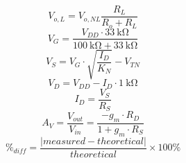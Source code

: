 %
\begin{equation}
  \label{eq:amp}
  V_{o,L} = V_{o,NL} \frac{R_L}{R_o + R_L}
\end{equation}
%
\begin{equation}
  \label{eq:V_G}
  V_G = \frac{V_{DD} \cdot \SI{33}{\kilo\ohm}}{\SI{100}{\kilo\ohm} + \SI{33}{\kilo\ohm}}
\end{equation}
%
\begin{equation}
  \label{eq:V_S}
  V_S = V_G \cdot \sqrt{\frac{I_D}{K_N}} - V_{TN}
\end{equation}
%
\begin{equation}
  \label{eq:V_D}
  V_D = V_{DD} - I_D \cdot \SI{1}{\kilo\ohm}
\end{equation}
%
\begin{equation}
  \label{eq:I_D}
  I_D = \frac{V_S}{R_S}
\end{equation}
%
\begin{equation}
  \label{eq:A_V}
  A_V = \frac{V_{out}}{V_{in}} = \frac{-g_m \cdot R_D}{1 + g_m \cdot R_S}
\end{equation}
%
\begin{equation}
  \label{eqn:percent_diff}
  \%_{diff} = \frac{|measured - theoretical|}{theoretical} \times 100\%
\end{equation}


